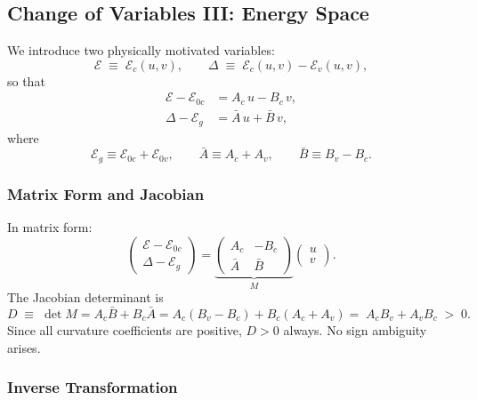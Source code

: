 \documentclass[11pt, a4paper]{article}
\newcommand{\E}{\mathcal{E}}
\newcommand{\Ec}{\E_c}
\newcommand{\Ev}{\E_v}
\newcommand{\Eoc}{\E_{0c}}
\newcommand{\Eov}{\E_{0v}}
\newcommand{\Eg}{\E_g}
\newcommand{\Abar}{\bar{A}}
\newcommand{\Bbar}{\bar{B}}
\begin{document}
\subsection{Change of Variables III: Energy Space}

We introduce two physically motivated variables:
\begin{equation}\label{eq:E-Delta-def}
    \E \;\equiv\; \Ec(u,v), \qquad
    \Delta \;\equiv\; \Ec(u,v) - \Ev(u,v),
\end{equation}
so that
\begin{align}
    \E - \Eoc &= A_c\, u - B_c\, v, \label{eq:E-uv}\\
    \Delta - \Eg &= \Abar\, u + \Bbar\, v, \label{eq:Delta-uv}
\end{align}
where
\begin{equation}\label{eq:combined-params}
    \boxed{\;
        \Eg \equiv \Eoc + \Eov, \qquad
        \Abar \equiv A_c + A_v, \qquad
        \Bbar \equiv B_v - B_c.
    \;}
\end{equation}

\subsubsection*{Matrix Form and Jacobian}

In matrix form:
\begin{equation}\label{eq:M}
    \begin{pmatrix} \E - \Eoc \\ \Delta - \Eg \end{pmatrix}
    = \underbrace{\begin{pmatrix} A_c & -B_c \\ \Abar & \Bbar \end{pmatrix}}_{M}
    \begin{pmatrix} u \\ v \end{pmatrix}.
\end{equation}
The Jacobian determinant is
\begin{equation}\label{eq:D}
    D \;\equiv\; \det M = A_c\Bbar + B_c\Abar
    = A_c(B_v - B_c) + B_c(A_c + A_v)
    = \boxed{\; A_c B_v + A_v B_c \;>\; 0. \;}
\end{equation}
Since all curvature coefficients are positive, $D > 0$ always. No sign ambiguity arises.

\subsubsection*{Inverse Transformation}
\end{document}
